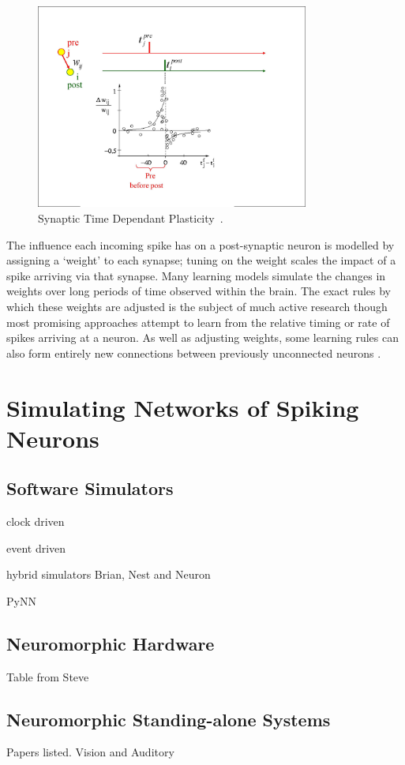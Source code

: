 \begin{figure}[bt]
	\centering
	\includegraphics[width=0.8\textwidth]{pics_snn/fig_stdp_orig.jpg}
	\caption{Synaptic Time Dependant Plasticity~\cite{gerstner2014neuronal}.}
	\label{Fig:STDP}
\end{figure}
The influence each incoming spike has on a post-synaptic neuron is modelled by assigning a `weight' to each synapse;
tuning on the weight scales the impact of a spike
arriving via that synapse.
Many learning models simulate the changes in weights over long periods of time observed within the brain.
The exact rules by which these weights are adjusted is the subject of much active research though most promising approaches attempt to learn from the relative timing \cite{pfister2006triplets} or rate \cite{bienenstock1982theory} of spikes arriving at a neuron.
As well as adjusting weights, some learning rules can also form entirely new connections between previously unconnected
neurons \cite{bamford2010synaptic}.

\section{Simulating Networks of Spiking Neurons}
\label{sec:snn_sim}
\subsection{Software Simulators}
clock driven

event driven

hybrid simulators Brian, Nest and Neuron

PyNN
\subsection{Neuromorphic Hardware}
Table from Steve
\subsection{Neuromorphic Standing-alone Systems}
Papers listed.
Vision and Auditory
\label{sec:morph}

